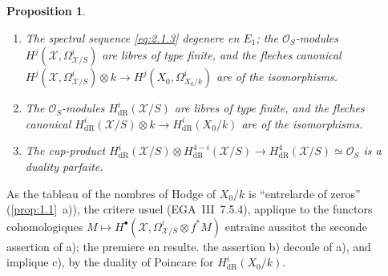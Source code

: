 \documentclass[12pt,a4paper]{article}
\theoremstyle{plain}
\newtheorem{proposition}[theorem]{Proposition}
\theoremstyle{definition}
\theoremstyle{remark}
\begin{document}
\begin{proposition}\label{prop:2.2}
\begin{enumerate}[label=\alph*)]
\item The spectral sequence \eqref{eq:2.1.3} degenere en $E_1$; the $\mathcal{O}_S$-modules $H^j(\mathcal{X}, \Omega_{\mathcal{X}/S}^i)$ are libres of type finite, and the fleches canonical $H^j(\mathcal{X}, \Omega_{\mathcal{X}/S}^i) \otimes k \to H^j(X_0, \Omega_{X_0/k}^i)$ are of the isomorphisms.
\item The $\mathcal{O}_S$-modules $H^i_{\mathrm{dR}}(\mathcal{X}/S)$ are libres of type finite, and the fleches canonical $H^i_{\mathrm{dR}}(\mathcal{X}/S) \otimes k \to H^i_{\mathrm{dR}}(X_0/k)$ are of the isomorphisms.
\item The cup-product $H^i_{\mathrm{dR}}(\mathcal{X}/S) \otimes H^{4-i}_{\mathrm{dR}}(\mathcal{X}/S) \to H^4_{\mathrm{dR}}(\mathcal{X}/S) \simeq \mathcal{O}_S$ is a duality parfaite.
\end{enumerate}
\end{proposition}

As the tableau of the nombres of Hodge of $X_0/k$ is ``entrelarde of zeros'' (\ref{prop:1.1}~a)), the critere usuel (EGA~III~7.5.4), applique to the functors cohomologiques $M \mapsto H^{\bullet}(\mathcal{X}, \Omega_{\mathcal{X}/S}^i \otimes f^* M)$ entraine aussitot the seconde assertion of a); the premiere en resulte. the assertion b) decoule of a), and implique c), by the duality of Poincare for $H^i_{\mathrm{dR}}(X_0/k)$.

\subsection{}
\end{document}
